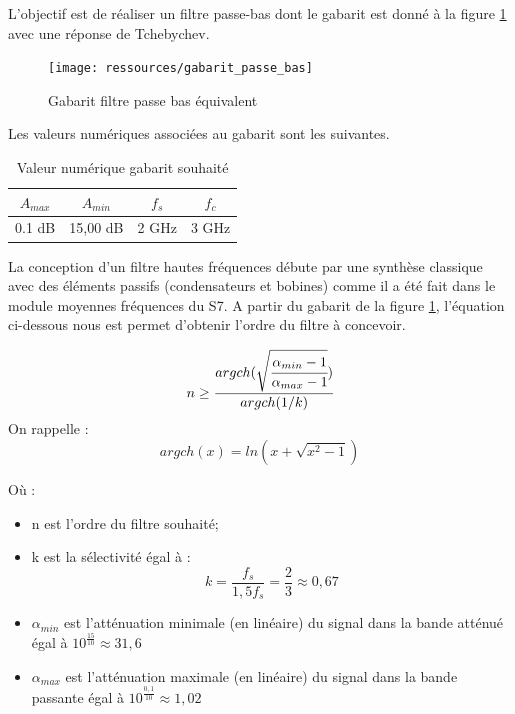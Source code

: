 \documentclass[french]{article}
\begin{document}
L'objectif est de réaliser un filtre passe-bas dont le gabarit est donné à la figure \ref{fig:gabarit_PasseBas} avec une réponse de Tchebychev.

\begin{figure}[H]
	\centering
	\texttt{[image: ressources/gabarit\_passe\_bas]}
	\caption{Gabarit filtre passe bas équivalent}
	\label{fig:gabarit_PasseBas}
\end{figure}

Les valeurs numériques associées au gabarit sont les suivantes.
\begin{table}[H]
	\centering
	\begin{tabular}{|c|c|c|c|}
		\hline
		$A_{max}$& $A_{min}$ & $f_s$ & $f_c$ \\ \hline
		0.1	dB & 15,00 dB 		& 2 GHz	   & 3 GHz \\ \hline
	\end{tabular}
	\caption{Valeur numérique gabarit souhaité}
\end{table}
La conception d'un filtre hautes fréquences débute par une synthèse classique avec des éléments passifs (condensateurs et bobines) comme il a été fait dans le module moyennes fréquences du S7. A partir du gabarit de la figure \ref{fig:gabarit_PasseBas}, l'équation ci-dessous nous est permet d'obtenir l'ordre du filtre à concevoir.


\begin{equation}
	n \geq \cfrac{argch(\sqrt{\cfrac{\alpha_{min}-1}{\alpha_{max} -1}})}{argch(1/k)}
\end{equation}
On rappelle :
\begin{equation}
argch(x)=ln(x+\sqrt{x^2-1})
\end{equation}

Où :
\begin{itemize}
	\item n est l'ordre du filtre souhaité;
		\item k est la sélectivité égal à : 
	\begin{equation}
	k=\frac{f_s}{1,5f_s} = \frac{2}{3} \approx 0,67
	\end{equation}
	\item $\alpha_{min}$ est l'atténuation minimale (en linéaire) du signal dans la bande atténué égal à $10^{\frac{15}{10}} \approx 31,6$
	\item $\alpha_{max}$ est l'atténuation maximale (en linéaire) du signal dans la bande passante égal à $10^{\frac{0,1}{10}} \approx 1,02$
\end{itemize}
\end{document}
